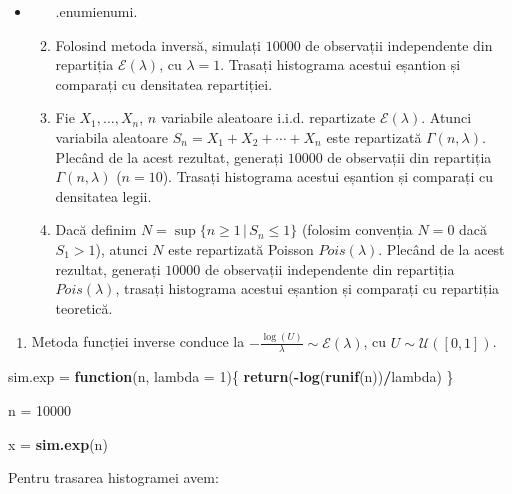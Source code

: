 \documentclass[]{article}
\newenvironment{Shaded}{\begin{snugshade}}{\end{snugshade}}
\newcommand{\ControlFlowTok}[1]{\textcolor[rgb]{0.13,0.29,0.53}{\textbf{#1}}}
\newcommand{\DataTypeTok}[1]{\textcolor[rgb]{0.13,0.29,0.53}{#1}}
\newcommand{\DecValTok}[1]{\textcolor[rgb]{0.00,0.00,0.81}{#1}}
\newcommand{\KeywordTok}[1]{\textcolor[rgb]{0.13,0.29,0.53}{\textbf{#1}}}
\newcommand{\NormalTok}[1]{#1}
\newcommand{\OperatorTok}[1]{\textcolor[rgb]{0.81,0.36,0.00}{\textbf{#1}}}
\newcommand{\StringTok}[1]{\textcolor[rgb]{0.31,0.60,0.02}{#1}}
\providecommand{\tightlist}{%
  \setlength{\itemsep}{0pt}\setlength{\parskip}{0pt}}
\newenvironment{frshaded*}{%
  \def\FrameCommand{\fboxrule=\FrameRule\fboxsep=\FrameSep \fcolorbox{framecolor}{shadecolor1}}%
  \MakeFramed {\advance\hsize-\width \FrameRestore}}%
{\endMakeFramed}
\newenvironment{rmdblock}[1]
  {\begin{frshaded*}
  \begin{itemize}
  \renewcommand{\labelitemi}{
    \raisebox{-.7\height}[0pt][0pt]{
      {\setkeys{Gin}{width=2em,keepaspectratio}\texttt{[image: images/icons/\#1]}}
    }
  }
  \item
  }
  {
  \end{itemize}
  \end{frshaded*}
  }
\newenvironment{rmdexercise}
  {\begin{rmdblock}{exercise}}
  {\end{rmdblock}}
\begin{document}
\begin{rmdexercise}
\begin{enumerate}
\def\arabic{enumi}.{\arabic{enumi}.}
\item
  Folosind metoda inversă, simulați \(10000\) de observații independente
  din repartiția \(\mathcal{E}(\lambda)\), cu \(\lambda = 1\). Trasați
  histograma acestui eșantion și comparați cu densitatea repartiției.
\item
  Fie \(X_1, \ldots, X_n\), \(n\) variabile aleatoare i.i.d. repartizate
  \(\mathcal{E}(\lambda)\). Atunci variabila aleatoare
  \(S_n = X_1 + X_2 +\cdots+ X_n\) este repartizată
  \(\Gamma(n, \lambda)\). Plecând de la acest rezultat, generați
  \(10000\) de observații din repartiția \(\Gamma(n, \lambda)\)
  (\(n = 10\)). Trasați histograma acestui eșantion și comparați cu
  densitatea legii.
\item
  Dacă definim \(N = \sup\{n\geq 1\,|\, S_n\leq 1\}\) (folosim convenția
  \(N = 0\) dacă \(S_1>1\)), atunci \(N\) este repartizată Poisson
  \(Pois(\lambda)\). Plecând de la acest rezultat, generați \(10000\) de
  observații independente din repartiția \(Pois(\lambda)\), trasați
  histograma acestui eșantion și comparați cu repartiția teoretică.
\end{enumerate}
\end{rmdexercise}

\begin{enumerate}
\def\labelenumi{\arabic{enumi}.}
\tightlist
\item
  Metoda funcției inverse conduce la
  \(-\frac{\log(U)}{\lambda}\sim\mathcal{E}(\lambda)\), cu
  \(U\sim\mathcal{U}([0,1])\).
\end{enumerate}

\begin{Shaded}
\begin{Highlighting}[]
\NormalTok{sim.exp =}\StringTok{ }\ControlFlowTok{function}\NormalTok{(n, }\DataTypeTok{lambda =} \DecValTok{1}\NormalTok{)\{}
  \KeywordTok{return}\NormalTok{(}\OperatorTok{-}\KeywordTok{log}\NormalTok{(}\KeywordTok{runif}\NormalTok{(n))}\OperatorTok{/}\NormalTok{lambda)}
\NormalTok{\}}

\NormalTok{n =}\StringTok{ }\DecValTok{10000}

\NormalTok{x =}\StringTok{ }\KeywordTok{sim.exp}\NormalTok{(n)}
\end{Highlighting}
\end{Shaded}

Pentru trasarea histogramei avem:
\end{document}

